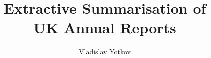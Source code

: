 \documentclass[12pt]{third-rep}
\title{Extractive Summarisation of\\
  UK Annual Reports}
\author{Vladislav Yotkov}
\begin{document}
\dotitleandabstract

\tableofcontents



\listoffigures
\listoftables







%
\end{document}
